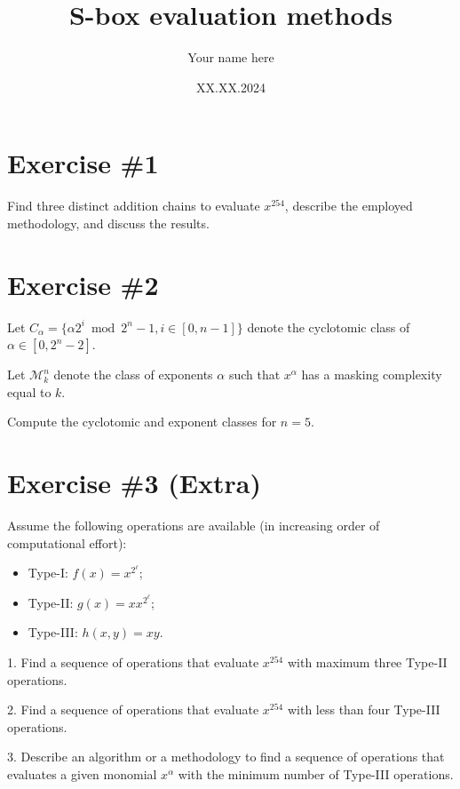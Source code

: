\documentclass{article}
\author{Your name here}
\date{XX.XX.2024}
\title{S-box evaluation methods}
\begin{document}
\maketitle

\section{Exercise \#1}

Find three distinct addition chains to evaluate $x^{254}$, describe the employed methodology, and discuss the results.

\section{Exercise \#2}

Let $C_\alpha = \{ \alpha2^i \bmod{2^n-1}, i\in[0,n-1]\}$ denote the cyclotomic class of $\alpha\in[0,2^n-2]$.

Let $\mathcal{M}_k^n$ denote the class of exponents $\alpha$ such that $x^\alpha$ has a masking complexity equal to $k$.

Compute the cyclotomic and exponent classes for $n=5$.

\section{Exercise \#3 (Extra)}

Assume the following operations are available (in increasing order of computational effort):
\begin{itemize}
  \item Type-I: $f(x)=x^{2^\ell}$;
  \item Type-II: $g(x)=xx^{2^\ell}$;
  \item Type-III: $h(x,y)=xy$.
\end{itemize}


1. Find a sequence of operations that evaluate $x^{254}$ with maximum three Type-II operations.

2. Find a sequence of operations that evaluate $x^{254}$ with less than four Type-III operations.

3. Describe an algorithm or a methodology to find a sequence of operations that evaluates a given monomial $x^{\alpha}$ with the minimum number of Type-III
operations.

\printbibliography
\end{document}
